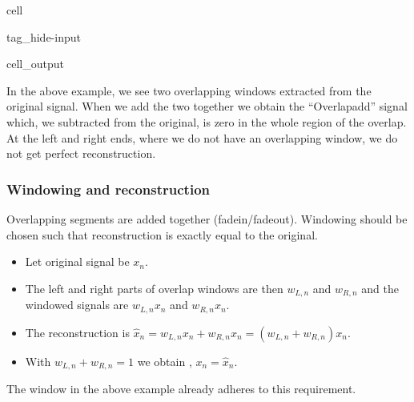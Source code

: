 \documentclass[letterpaper,10pt,english]{jupyterBook}
\begin{document}
\begin{sphinxuseclass}{cell}
\begin{sphinxuseclass}{tag_hide-input}\begin{sphinxVerbatimOutput}

\begin{sphinxuseclass}{cell_output}
\noindent{}

\end{sphinxuseclass}\end{sphinxVerbatimOutput}

\end{sphinxuseclass}
\end{sphinxuseclass}
\sphinxAtStartPar
In the above example, we see two overlapping windows extracted from the original signal. When we add the two together we obtain the “Overlap\sphinxhyphen{}add” signal which, we subtracted from the original, is zero in the whole region of the overlap. At the left and right ends, where we do not have an overlapping window, we do not get perfect reconstruction.


\subsubsection{Windowing and reconstruction}
\label{\detokenize{Representations/Short-time_processing:windowing-and-reconstruction}}
\sphinxAtStartPar
Overlapping segments are added together (fade\sphinxhyphen{}in/fade\sphinxhyphen{}out).
Windowing should be chosen such that reconstruction is exactly  equal to the original.
\begin{itemize}
\item {} 
\sphinxAtStartPar
Let original signal be \(x_n\).

\item {} 
\sphinxAtStartPar
The left and right parts of overlap windows are then \(w_{L,n}\) and \(w_{R,n}\) and the windowed signals are \(w_{L,n}x_n\) and \(w_{R,n}x_n\).

\item {} 
\sphinxAtStartPar
The reconstruction is \(\hat x_n = w_{L,n}x_n + w_{R,n}x_n = (w_{L,n} + w_{R,n})x_n\).

\item {} 
\sphinxAtStartPar
With \(w_{L,n} + w_{R,n} = 1\) we obtain , \(x_n = \hat x_n\).

\end{itemize}

\sphinxAtStartPar
The window in the above example already adheres to this requirement.
\end{document}

